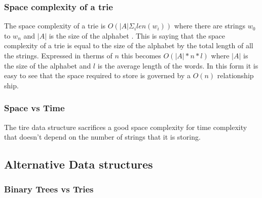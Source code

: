 \documentclass[10pt]{article} %
\begin{document}
			\subsubsection{Space complexity of a trie}
			    The space complexity of a trie is \begin{math} O(\vert A \vert \Sigma_i len(w_i))\end{math} where there are strings \begin{math} w_0 \end{math} to \begin{math} w_n \end{math} and \begin{math}\vert A \vert \end{math} is the size of the alphabet \cite{book:ADS:complexity}. This is saying that the space complexity of a trie is equal to the size of the alphabet by the total length of all the strings. Expressed in therms of \begin{math} n \end{math} this becomes \begin{math} O(\vert A \vert * n * l )\end{math} where \begin{math}\vert A \vert \end{math} is the size of the alphabet and \begin{math} l \end{math} is the average length of the words. In this form it is easy to see that the space required to store is governed by a  \begin{math} O(n) \end{math} relationship ship.
			    
            \subsubsection{Space vs Time}
                The tire data structure sacrifices a good space complexity for time complexity that doesn't depend on the number of strings that it is storing. 
                
		\subsection{Alternative Data structures}
			\subsubsection{Binary Trees vs Tries}
			
\end{document}
